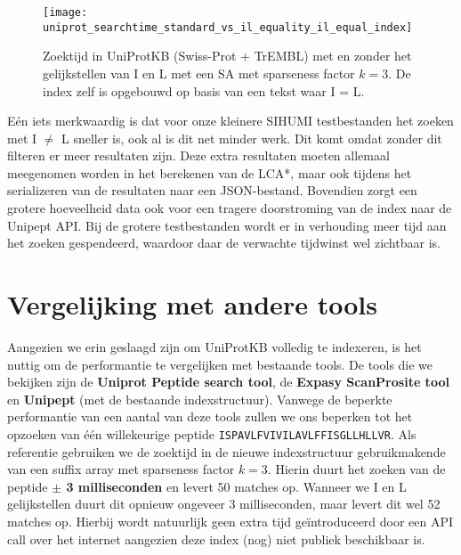 \begin{figure}[ht]
    \centering
    \texttt{[image: uniprot\_searchtime\_standard\_vs\_il\_equality\_il\_equal\_index]}
    \caption{Zoektijd in UniProtKB (Swiss-Prot + TrEMBL) met en zonder het gelijkstellen van I en L met een SA met sparseness factor $k = 3$. De index zelf is opgebouwd op basis van een tekst waar I = L.}
    \label{fig:uniprot_search_il_equal}
\end{figure}

Eén iets merkwaardig is dat voor onze kleinere SIHUMI testbestanden het zoeken met I $\neq$ L sneller is, ook al is dit net minder werk.
Dit komt omdat zonder dit filteren er meer resultaten zijn.
Deze extra resultaten moeten allemaal meegenomen worden in het berekenen van de LCA*, maar ook tijdens het serializeren van de resultaten naar een JSON-bestand.
Bovendien zorgt een grotere hoeveelheid data ook voor een tragere doorstroming van de index naar de Unipept API\@.
Bij de grotere testbestanden wordt er in verhouding meer tijd aan het zoeken gespendeerd, waardoor daar de verwachte tijdwinst wel zichtbaar is.

\section{Vergelijking met andere tools}\label{subsec:vergelijking-met-andere-tools}
Aangezien we erin geslaagd zijn om UniProtKB volledig te indexeren, is het nuttig om de performantie te vergelijken met bestaande tools.
De tools die we bekijken zijn de \textbf{Uniprot Peptide search tool}, de \textbf{Expasy ScanProsite tool} en \textbf{Unipept} (met de bestaande indexstructuur).
Vanwege de beperkte performantie van een aantal van deze tools zullen we ons beperken tot het opzoeken van één willekeurige peptide \texttt{ISPAVLFVIVILAVLFFISGLLHLLVR}.
Als referentie gebruiken we de zoektijd in de nieuwe indexstructuur gebruikmakende van een suffix array met sparseness factor $k = 3$.
Hierin duurt het zoeken van de peptide \textbf{$\pm$ 3 milliseconden} en levert 50 matches op.
Wanneer we I en L gelijkstellen duurt dit opnieuw ongeveer 3 milliseconden, maar levert dit wel 52 matches op.
Hierbij wordt natuurlijk geen extra tijd geïntroduceerd door een API call over het internet aangezien deze index (nog) niet publiek beschikbaar is.

